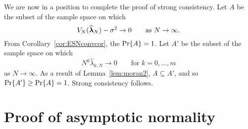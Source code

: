\documentclass[journal]{IEEEtran}
\begin{document}
We are now in a position to complete the proof of strong consistency.  Let $A$ be the subset of the sample space on which 
\[
V_N(\widehat{\boldsymbol{\lambda}}_N) - \sigma^2 \rightarrow 0 \qquad \text{as $N\rightarrow\infty$}.
\]
From Corollary~\ref{cor:ESNconvcor}, the $\operatorname{Pr}\{A\} =1$.  Let $A'$ be the subset of the sample space on which 
\[
N^k\widehat{\lambda}_{k,N} \rightarrow 0 \qquad \text{for $k=0,\dots,m$}
\] 
as $N\rightarrow\infty$.  As a result of Lemma~\ref{lem:moran2}, $A \subseteq A'$, and so $\operatorname{Pr}\{A'\} \geq \operatorname{Pr}\{A\} = 1$.  Strong consistency follows.

\section{Proof of asymptotic normality}\label{sec:centlimitproof}
\end{document}
